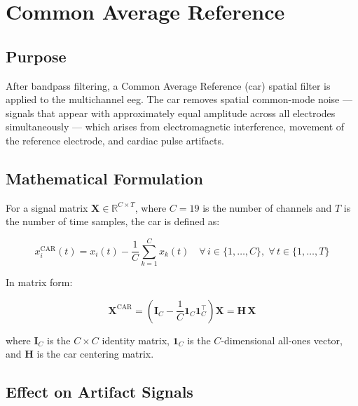\section{Common Average Reference}
\label{sec:sp_car}

\subsection{Purpose}

After bandpass filtering, a Common Average Reference
(\acrshort{car}) spatial filter is applied to the multichannel
\acrshort{eeg}. The \acrshort{car} removes spatial
common-mode noise — signals that appear with approximately
equal amplitude across all electrodes simultaneously — which
arises from electromagnetic interference, movement of the
reference electrode, and cardiac pulse artifacts.

\subsection{Mathematical Formulation}

For a signal matrix $\mathbf{X} \in \mathbb{R}^{C \times T}$,
where $C = 19$ is the number of channels and $T$ is the number
of time samples, the \acrshort{car} is defined as:

\begin{equation}
x_i^{\text{CAR}}(t) = x_i(t) - \frac{1}{C}
\sum_{k=1}^{C} x_k(t)
\quad \forall\, i \in \{1, \ldots, C\},\;
\forall\, t \in \{1, \ldots, T\}
\label{eq:car}
\end{equation}

\noindent In matrix form:

\begin{equation}
\mathbf{X}^{\text{CAR}} = \left(\mathbf{I}_C -
\frac{1}{C}\mathbf{1}_C\mathbf{1}_C^\top\right)\mathbf{X}
= \mathbf{H}\,\mathbf{X}
\label{eq:car_matrix}
\end{equation}

\noindent where $\mathbf{I}_C$ is the $C \times C$ identity
matrix, $\mathbf{1}_C$ is the $C$-dimensional all-ones vector,
and $\mathbf{H}$ is the \acrshort{car} centering matrix.

\subsection{Effect on Artifact Signals}

